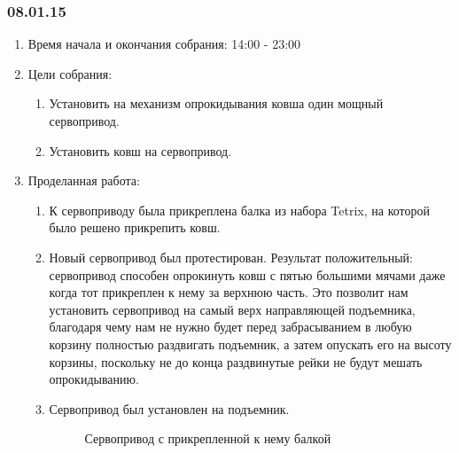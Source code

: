 \subsubsection{08.01.15}

\begin{enumerate}
	\item Время начала и окончания собрания: 14:00 - 23:00
	
	\item Цели собрания: 
	\begin{enumerate}
		
	  \item Установить на механизм опрокидывания ковша один мощный сервопривод.
		
	  \item Установить ковш на сервопривод.
		
	\end{enumerate}
	
	\item Проделанная работа:
	\begin{enumerate}
		
	  \item К сервоприводу была прикреплена балка из набора Tetrix, на которой было решено прикрепить ковш.
		
	  \item Новый сервопривод был протестирован. Результат положительный: сервопривод способен опрокинуть ковш с пятью большими мячами даже когда тот прикреплен к нему за верхнюю часть. Это позволит нам установить сервопривод на самый верх направляющей подъемника, благодаря чему нам не нужно будет перед забрасыванием в любую корзину полностью раздвигать подъемник, а затем опускать его на высоту корзины, поскольку не до конца раздвинутые рейки не будут мешать опрокидыванию.
		
	  \item Сервопривод был установлен на подъемник.
      \begin{figure}[H]
      	\begin{minipage}[h]{1\linewidth}
      		\caption{Сервопривод с прикрепленной к нему балкой}
      	\end{minipage}
      \end{figure}	
      

\end{enumerate}
\end{enumerate}
